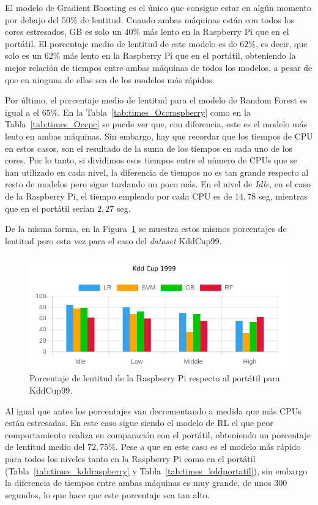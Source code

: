 \documentclass[a4paper, 12pt]{book}
\begin{document}
El modelo de Gradient Boosting es el único que consigue estar en algún momento por debajo del $50\%$ de lentitud. Cuando ambas máquinas están con todos los cores estresados, GB es solo un $40\%$ más lento en la Raspberry Pi que en el portátil. El porcentaje medio de lentitud de este modelo es de $62\%$, es decir, que solo es un $62\%$ más lento en la Raspberry Pi que en el portátil, obteniendo la mejor relación de tiempos entre ambas máquinas de todos los modelos, a pesar de que en ninguna de ellas sea de los modelos más rápidos.

Por último, el porcentaje medio de lentitud para el modelo de Random Forest es igual a el $65\%$. En la Tabla~\ref{tab:times_Occraspberry} como en la Tabla~\ref{tab:times_Occpc} se puede ver que, con diferencia, este es el modelo más lento en ambas máquinas. Sin embargo, hay que recordar que los tiempos de CPU en estos casos, son el resultado de la suma de los tiempos en cada uno de los cores. Por lo tanto, si dividimos esos tiempos entre el número de CPUs que se han utilizado en cada nivel, la diferencia de tiempos no es tan grande respecto al resto de modelos pero sigue tardando un poco más. En el nivel de \textit{Idle}, en el caso de la Raspberry Pi, el tiempo empleado por cada CPU es de $14,78$ seg, mientras que en el portátil serían $2,27$ seg.

De la misma forma, en la Figura~\ref{fig:per_kdd} se muestra estos mismos porcentajes de lentitud pero esta vez para el caso del \textit{dataset} KddCup99.

\begin{figure}[htb]
  \centering
  \includegraphics[width=14cm, keepaspectratio]{img/per_kdd.png}
  \caption{Porcentaje de lentitud de la Raspberry Pi respecto al portátil para KddCup99.}
  \label{fig:per_kdd}
\end{figure}

Al igual que antes los porcentajes van decrementando a medida que más CPUs están estresadas. En este caso sigue siendo el modelo de RL el que peor comportamiento realiza en comparación con el portátil, obteniendo un porcentaje de lentitud medio del $72,75\%$. Pese a que en este caso es el modelo más rápido para todos los niveles tanto en la Raspberry Pi como en el portátil (Tabla~\ref{tab:times_kddraspberry} y Tabla~\ref{tab:times_kddportatil}), sin embargo la diferencia de tiempos entre ambas máquinas es muy grande, de unos $300$ segundos, lo que hace que este porcentaje sea tan alto.
\end{document}
